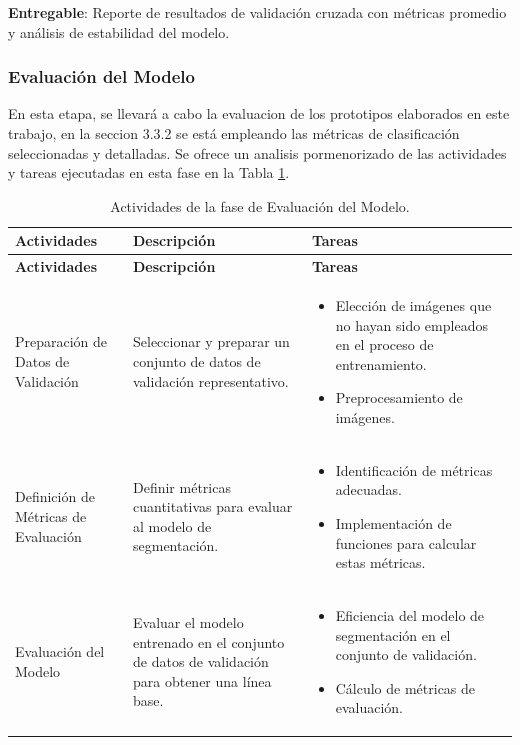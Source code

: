  \textbf{Entregable}: Reporte de resultados de validación cruzada con métricas promedio y análisis de estabilidad del modelo.

\subsubsection{Evaluación del Modelo}
En esta etapa, se llevará a cabo la evaluacion de los prototipos elaborados en este trabajo, en la seccion 3.3.2 se está empleando las métricas de clasificación seleccionadas y detalladas. Se ofrece un analisis pormenorizado de las actividades y tareas ejecutadas en esta fase en la Tabla \ref{tabla:evaluacion_modelo}.

\vspace{2ex}
 \begingroup
 \renewcommand\arraystretch{1.2}
 \begin{longtable}{>{\raggedright\arraybackslash}p{4cm} >{\raggedright\arraybackslash}p{4cm} >{\raggedright\arraybackslash}p{5cm}}
 \caption{Actividades de la fase de Evaluación del Modelo.}
 \label{tabla:evaluacion_modelo}\\
 \toprule
 \textbf{Actividades} & \textbf{Descripción} & \textbf{Tareas} \\
 \midrule
 \endfirsthead
 
 \toprule
 \textbf{Actividades} & \textbf{Descripción} & \textbf{Tareas} \\
 \midrule
 \endhead
 
 \bottomrule
 \endfoot
 
 Preparación de Datos de Validación & Seleccionar y preparar un conjunto de datos de validación representativo. & 
 \begin{itemize}
     \item Elección de imágenes que no hayan sido empleados en el proceso de entrenamiento.
     \item Preprocesamiento de imágenes.
 \end{itemize} \\
 
 Definición de Métricas de Evaluación & Definir métricas cuantitativas para evaluar al modelo de segmentación. & 
 \begin{itemize}
     \item Identificación de métricas adecuadas.
     \item Implementación de funciones para calcular estas métricas.
 \end{itemize} \\
 
 Evaluación del Modelo & Evaluar el modelo entrenado en el conjunto de datos de validación para obtener una línea base. & 
 \begin{itemize}
     \item Eficiencia del modelo de segmentación en el conjunto de validación.
     \item Cálculo de métricas de evaluación.
 \end{itemize} \\
 
 \end{longtable}
 \endgroup

